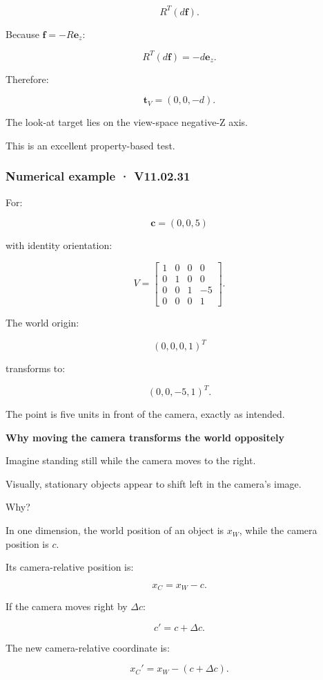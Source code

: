 \[
 R^T(d\mathbf f).
\]

Because \(\mathbf f=-R\mathbf e_z\):

\[
 R^T(d\mathbf f) = -d\mathbf e_z.
\]

Therefore:

\[
 \boxed{ \mathbf t_V=(0,0,-d) }.
\]

The look-at target lies on the view-space negative-Z axis.

This is an excellent property-based test.

\subsubsection{Numerical example · V11.02.31}\label{02-foundations-ii-ch032-numerical-example-v11.02.31}

For:

\[
 \mathbf c=(0,0,5)
\]

with identity orientation:

\[
 \boxed{ V= \begin{bmatrix} 1&0&0&0\\ 0&1&0&0\\ 0&0&1&-5\\ 0&0&0&1 \end{bmatrix} }.
\]

The world origin:

\[
 (0,0,0,1)^T
\]

transforms to:

\[
 \boxed{(0,0,-5,1)^T}.
\]

The point is five units in front of the camera, exactly as intended.

\textbf{Why moving the camera transforms the world oppositely}

Imagine standing still while the camera moves to the right.

Visually, stationary objects appear to shift left in the camera's image.

Why?

In one dimension, the world position of an object is \(x_W\), while the camera position is \(c\).

Its camera-relative position is:

\[
 \boxed{x_C=x_W-c}.
\]

If the camera moves right by \(\Delta c\):

\[
 c'=c+\Delta c.
\]

The new camera-relative coordinate is:

\[
 x_C'=x_W-(c+\Delta c).
\]

